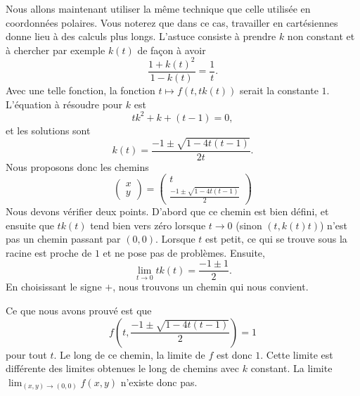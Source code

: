 \begin{example}
    Nous allons maintenant utiliser la même technique que celle utilisée en coordonnées polaires. Vous noterez que dans ce cas, travailler en cartésiennes donne lieu à des calculs plus longs.  L'astuce consiste à prendre \( k\) non constant et à chercher par exemple \( k(t)\) de façon à avoir
    \begin{equation}
        \frac{ 1+k(t)^2 }{ 1-k(t) }=\frac{1}{ t }.
    \end{equation}
    Avec une telle fonction, la fonction \( t\mapsto f(t,tk(t))\) serait la constante \( 1\). L'équation à résoudre pour \( k\) est
    \begin{equation}
        tk^2+k+(t-1)=0,
    \end{equation}
    et les solutions sont
    \begin{equation}
        k(t)=\frac{ -1\pm\sqrt{1-4t(t-1)} }{ 2t }.
    \end{equation}
    Nous proposons donc les chemins
    \begin{equation}
        \begin{pmatrix}
            x    \\ 
            y    
        \end{pmatrix}=\begin{pmatrix}
            t    \\ 
            \frac{ -1\pm\sqrt{1-4t(t-1)}    }{2}
        \end{pmatrix}
    \end{equation}
    Nous devons vérifier deux points. D'abord que ce chemin est bien défini, et ensuite que \( tk(t)\) tend bien vers zéro lorsque \( t\to 0\) (sinon \( (t,k(t)t)\)) n'est pas un chemin passant par \( (0,0)\). Lorsque \( t\) est petit, ce qui se trouve sous la racine est proche de \( 1\) et ne pose pas de problèmes. Ensuite,
    \begin{equation}
        \lim_{t\to 0} tk(t)=\frac{ -1\pm 1 }{ 2 }.
    \end{equation}
    En choisissant le signe \( +\), nous trouvons un chemin qui nous convient. 

    Ce que nous avons prouvé est que
    \begin{equation}
        f\left( t,   \frac{ -1\pm\sqrt{1-4t(t-1)}    }{2}\right)=1
    \end{equation}
    pour tout \( t\). Le long de ce chemin, la limite de \( f\) est donc \( 1\). Cette limite est différente des limites obtenues le long de chemins avec \( k\) constant. La limite \( \lim_{(x,y)\to (0,0)} f(x,y)\) n'existe donc pas.
\end{example}

